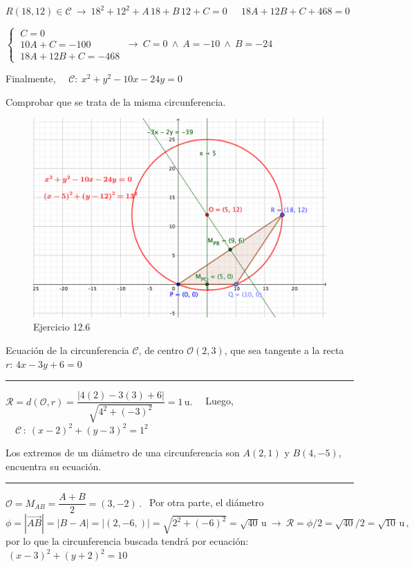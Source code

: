 \begin{miejercicio}
\vspace{2mm} $R(18,12)\in \mathcal C \ \to \ 18^2+12^2+A\, 18+B\, 12+ C=0 \ \quad \ 18A+12B+C+468=0$

\vspace{2mm} $\begin{cases} \ C=0 \\ \ 10A+C=-100 \\ \ 18A+12B+C=-468 \end{cases} \ \to \ C=0 \ \wedge \ A=-10 \ \wedge \ B=-24$

\vspace{2mm} Finalmente, $\quad \mathcal C:\ x^2+y^2-10x-24y=0 \ $
\begin{footnotesize} \textcolor{gris}{Comprobar que se trata de la misma circunferencia}. \end{footnotesize}


\end{miejercicio}

\begin{figure}[H]
	\centering
	\includegraphics[width=.7\textwidth]{img-conicas/conicas22.png}
	\caption*{\footnotesize{Ejercicio 12.6}}
	\end{figure}


\begin{miejercicio}

Ecuación de la circunferencia $\mathcal C$, de centro $\mathcal O(2,3)$, que sea tangente a la recta $r:\, 4x-3y+6=0$

\rule{250pt}{0.1pt}

\vspace{2mm} $\mathcal R=d(\mathcal O,r)=\dfrac{|4(2)-3(3)+6|}{\sqrt{4^2+(-3)^2}}=1\, \mathrm{u}.\quad $ Luego, $\quad \mathcal C\, : \ (x-2)^2+(y-3)^2=1^2$
\end{miejercicio}


\begin{miejercicio}

Los extremos de un diámetro de una circunferencia son $A(2,1)$ y $B(4,-5)$, encuentra su ecuación.

\rule{250pt}{0.1pt}

\vspace{2mm} $\mathcal O=M_{AB}=\dfrac{A+B}{2}=(3, -2)\, . \ \ $ Por otra parte, el diámetro $\phi=|\overrightarrow{AB}|=|B-A|=|(2,-6,)|=\sqrt{2^2+(-6)^2}=\sqrt{40}\, \mathrm{u} \ \to \ \mathcal R=\phi/2	=\sqrt{40}/2=\sqrt{10}\, \mathrm{u}\, , \ $ por lo que la circunferencia buscada tendrá por ecuación: $\ (x-3)^2+(y+2)^2=10$
\end{miejercicio}


